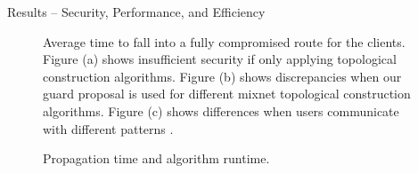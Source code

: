 \documentclass[final]{beamer}
\newlength{\maincolwidth}
\begin{document}
\begin{frame}[t]
\begin{columns}[t]
\begin{column}{\maincolwidth}
\begin{alertblock}{Results -- Security, Performance, and Efficiency}
\begin{minipage}[t]{0.95\maincolwidth}
\begin{figure}[t!]
    \caption{Average time to fall into a fully compromised route for the clients. 
    Figure (a) shows insufficient security if only applying topological construction algorithms. 
    Figure (b) shows discrepancies when our guard proposal is
used for different mixnet topological construction algorithms. 
Figure (c) shows differences when users communicate with different patterns .}
    \label{fig:placement}
\end{figure}
\vspace{1cm}
\begin{figure}[t!]
    \centering
    \caption{Propagation time and algorithm runtime.
       \vspace{0em}}
    \label{fig:placement}
\end{figure}
    \end{minipage}
    

\end{alertblock}
\end{column}
\end{columns}
\end{frame}
\end{document}
